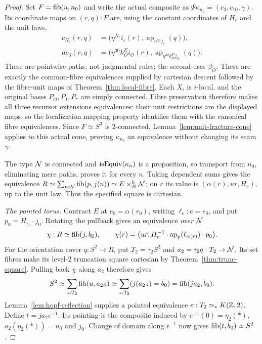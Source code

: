 \begin{proof}
Set $F=\operatorname{fib}(u,n_0)$ and write the actual composite as $\Psi\kappa_{n_0}=(c_3,c_{10},\gamma)$. Its coordinate maps on $(r,q):F$ are, using the constant coordinates of $H_r$ and the unit laws,
\[
\begin{aligned}
c_{N_c}(r,q)&=\bigl(\eta^{N_c}i_c(r),
       \operatorname{ap}_{\eta^{N_c}j_c}(q)\bigr),\\
a c_3(r,q)&=\bigl(\eta^{30}k_O^Ei_O(r),
       \operatorname{ap}_{\eta^{30}k_O^Pj_O}(q)\bigr).
\end{aligned}
\]
These are pointwise paths, not judgmental rules; the second uses $\beta_O$. These are exactly the common-fibre equivalences supplied by cartesian descent followed by the fibre-unit maps of Theorem~\ref{thm:local-fibre}. Each $X_i$ is $i$-local, and the original bases $P_O,P_I,P_*$ are simply connected. Fibre preservation therefore makes all three recursor extensions equivalences: their unit restrictions are the displayed maps, so the localization mapping property identifies them with the canonical fibre equivalences. Since $F\simeq S^3$ is $2$-connected, Lemma~\ref{lem:unit-fracture-cone} applies to this actual cone, proving $\kappa_{n_0}$ an equivalence without changing its seam $\gamma$.

The type $\mathcal N$ is connected and $\operatorname{isEquiv}(\kappa_n)$ is a proposition, so transport from $n_0$, eliminating mere paths, proves it for every $n$. Taking dependent sums gives the equivalence
$R\simeq\sum_{n:\mathcal N}\operatorname{fib}(p,j(n))\simeq E\mathbin{\times}^{h}_B\mathcal N$;
on $r$ its value is $(\alpha(r),u r,H_r)$, up to the unit law. Thus the specified square is cartesian.

\emph{The pointed torus.}
Contract $E$ at $e_0=\alpha(r_0)$, writing $\ell_e:e=e_0$, and put $p_0=H_{r_0}\cdot j_0$. Rotating the pullback gives an equivalence \emph{over $\mathcal N$}
\[
\chi:R\simeq\operatorname{fib}(j,b_0),\qquad
\chi(r)=\bigl(u r,H_r^{-1}\cdot\operatorname{ap}_p(\ell_{\alpha(r)})\cdot p_0\bigr).
\]
For the orientation cover $q:S^2\to R$, put $T_2=\tau_2S^2$ and $a_2=\tau_2q:T_2\to\mathcal N$. Its set fibres make its level-$2$ truncation square cartesian by Theorem~\ref{thm:trunc-square}. Pulling back $\chi$ along $a_2$ therefore gives
\[
S^2\simeq\sum_{z:T_2}\operatorname{fib}(u,a_2z)
 \simeq\sum_{z:T_2}(j(a_2z)=b_0)=\operatorname{fib}(j a_2,b_0).
\]
Lemma~\ref{lem:hopf-reflection} supplies a pointed equivalence $e:T_2\simeq_* K(\mathbb Z,2)$. Define $t=j a_2e^{-1}$. Its pointing is the composite induced by $e^{-1}(0)=\eta_2(*)$, $a_2(\eta_2(*))=n_0$ and $j_0$. Change of domain along $e^{-1}$ now gives $\operatorname{fib}(t,b_0)\simeq S^2$.
\end{proof}

